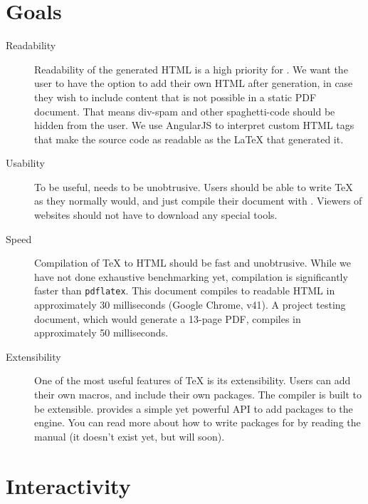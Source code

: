 \documentclass[11pt]{article}
\begin{document}
\section{Goals}
\begin{description}
    \item[Readability] Readability of the generated HTML is a high priority for \DiscoTeX{}.
        We want the user to have the option to add their own HTML after generation, in case they wish to include content that is not possible in a static PDF document.
        That means div-spam and other spaghetti-code should be hidden from the user.
        We use AngularJS to interpret custom HTML tags that make the source code as readable as the \LaTeX{} that generated it.

    \item[Usability] To be useful, \DiscoTeX{} needs to be unobtrusive.
        Users should be able to write \TeX{} as they normally would, and just compile their document with \DiscoTeX{}.
        Viewers of websites should not have to download any special tools.

    \item[Speed] Compilation of \TeX{} to HTML should be fast and unobtrusive.
        While we have not done exhaustive benchmarking yet, compilation is significantly faster than \verb|pdflatex|.
        This document compiles to readable HTML in approximately 30 milliseconds (Google Chrome, v41).
        A project testing document, which would generate a 13-page PDF, compiles in approximately 50 milliseconds.

    \item[Extensibility] One of the most useful features of \TeX{} is its extensibility.
        Users can add their own macros, and include their own packages.
        The \DiscoTeX{} compiler is built to be extensible.
        \DiscoTeX{} provides a simple yet powerful API to add packages to the engine.
        You can read more about how to write packages for \DiscoTeX{} by reading the manual (it doesn't exist yet, but will soon).
\end{description}

\section{Interactivity}
\end{document}
